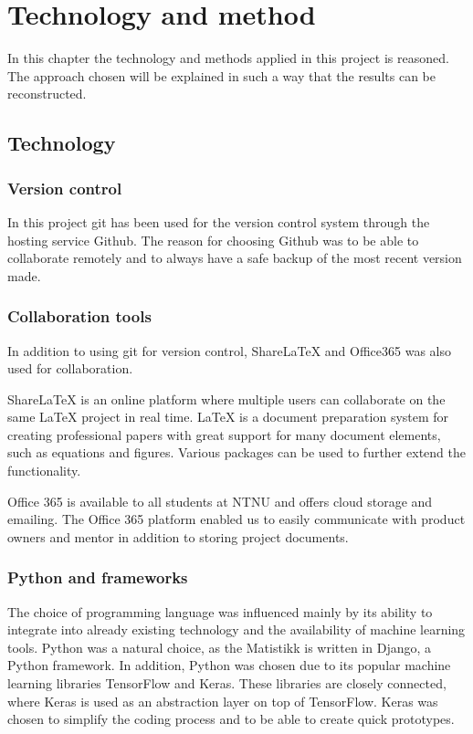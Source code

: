 \chapter{Technology and method}

In this chapter the technology and methods applied in this project is reasoned. The approach chosen will be explained in such a way that the results can be reconstructed.

\section{Technology}

\subsection{Version control}
In this project git has been used for the version control system through the hosting service Github. The reason for choosing Github was to be able to collaborate remotely and to always have a safe backup of the most recent version made.

\subsection{Collaboration tools}

In addition to using git for version control, ShareLaTeX and Office365 was also used for collaboration. 

ShareLaTeX is an online platform where multiple users can collaborate on the same LaTeX project in real time. LaTeX is a document preparation system for creating professional papers with great support for many document elements, such as equations and figures. Various packages can be used to further extend the functionality. 

Office 365 is available to all students at NTNU and offers cloud storage and emailing. The Office 365 platform enabled us to easily communicate with product owners and mentor in addition to storing project documents.


\subsection{Python and frameworks}
The choice of programming language was influenced mainly by its ability to integrate into already existing technology and the availability of machine learning tools. Python was a natural choice, as the Matistikk is written in Django, a Python framework. In addition, Python was chosen due to its popular machine learning libraries TensorFlow and Keras. These libraries are closely connected, where Keras is used as an abstraction layer on top of TensorFlow. Keras was chosen to simplify the coding process and to be able to create quick prototypes.


